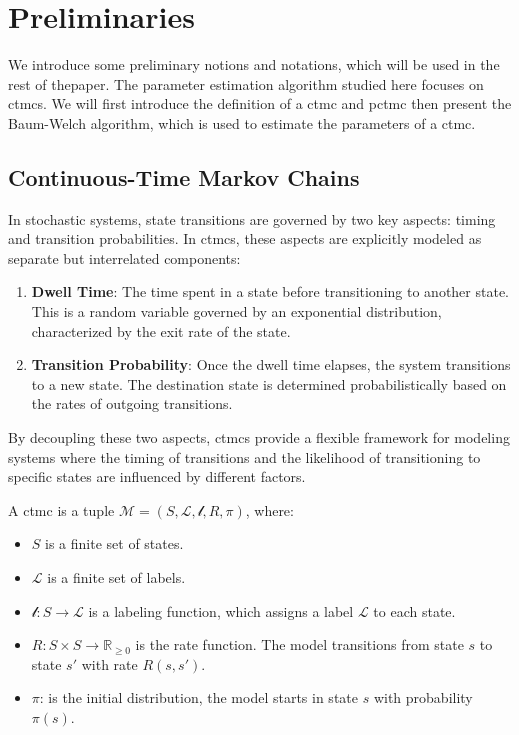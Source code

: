 \section{Preliminaries}\label{sec:preliminaries}
We introduce some preliminary notions and notations, which will be used in the rest of thepaper. 
The parameter estimation algorithm studied here focuses on \glspl{ctmc}.
We will first introduce the definition of a \gls{ctmc} and \gls{pctmc} then present the Baum-Welch algorithm, which is used to estimate the parameters of a \gls{ctmc}.

\subsection{Continuous-Time Markov Chains}
In stochastic systems, state transitions are governed by two key aspects: timing and transition probabilities. In \glspl{ctmc}, these aspects are explicitly modeled as separate but interrelated components:
\begin{enumerate}
    \item \textbf{Dwell Time}: The time spent in a state before transitioning to another state. This is a random variable governed by an exponential distribution, characterized by the exit rate of the state.
    \item \textbf{Transition Probability}: Once the dwell time elapses, the system transitions to a new state. The destination state is determined probabilistically based on the rates of outgoing transitions.
\end{enumerate}
By decoupling these two aspects, \glspl{ctmc} provide a flexible framework for modeling systems where the timing of transitions and the likelihood of transitioning to specific states are influenced by different factors.

\begin{definition}
    A \gls{ctmc} is a tuple $\mathcal{M} = (S, \mathcal{L}, \mathscr{l}, R, \pi)$, where:
    \begin{itemize}
        \item $S$ is a finite set of states.
        \item $\mathcal{L}$ is a finite set of labels.
        \item $\mathscr{l}: S \rightarrow \mathcal{L}$ is a labeling function, which assigns a label $\mathcal{L}$ to each state.
        \item $R: S \times S \rightarrow \mathbb{R}_{\geq 0}$ is the rate function. The model transitions from state $s$ to state $s'$ with rate $R(s, s')$.
        \item $\pi$: is the initial distribution, the model starts in state $s$ with probability $\pi(s)$.
    \end{itemize}
\end{definition}

